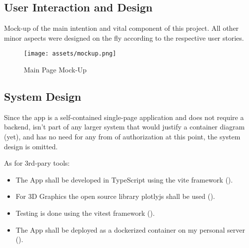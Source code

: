 \newpage
\subsection{ User Interaction and Design}

Mock-up of the main intention and vital component of this project. All other minor aspects were designed on the fly according to the respective user stories.
\begin{figure}[!h]
    \centering
    \caption{Main Page Mock-Up}
    \texttt{[image: assets/mockup.png]}
    \label{fig:mockup}
\end{figure}

\subsection{System Design}

Since the app is a self-contained single-page application and does not require a backend, isn’t part of any larger system that would justify a container diagram (yet), and has no need for any from of authorization at this point, the system design is omitted.

As for 3rd-pary tools:
\begin{itemize}
    \item The App shall be developed in TypeScript using the vite framework (\cite{Vite}).

    \item For 3D Graphics the open source library plotlyjs shall be used (\cite{PlotlyJS}).

    \item Testing is done using the vitest framework (\cite{Vitest}).

    \item The App shall be deployed as a dockerized container on my personal server (\cite{Docker}).
\end{itemize}